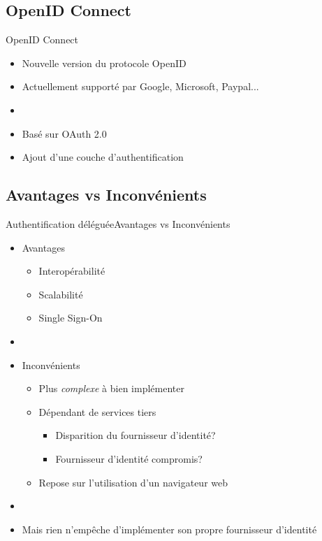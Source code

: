 \documentclass{beamer}
\begin{document}
\subsection{OpenID Connect}

\begin{frame}{OpenID Connect}
  \begin{center}
    \begin{itemize}
    \item Nouvelle version du protocole OpenID
    \item Actuellement supporté par Google, Microsoft, Paypal...
    \item[~]
    \item Basé sur OAuth 2.0
    \item Ajout d'une couche d'authentification
    \end{itemize}
  \end{center}
\end{frame}

\subsection{Avantages vs Inconvénients}

\begin{frame}{Authentification déléguée}{Avantages vs Inconvénients}
  \begin{center}
    \begin{itemize}
      \item Avantages
      \begin{itemize}
        \item Interopérabilité
        \item Scalabilité
        \item Single Sign-On
      \end{itemize}
      \pause
      \item[~]
      \item Inconvénients
      \begin{itemize}
        \item Plus \emph{complexe} à bien implémenter
        \item Dépendant de services tiers
        \begin{itemize}
          \item Disparition du fournisseur d'identité?
          \item Fournisseur d'identité compromis?
        \end{itemize}
        \item Repose sur l'utilisation d'un navigateur web
      \end{itemize}
      \pause
      \item[~]
      \item Mais rien n'empêche d'implémenter son propre fournisseur d'identité
    \end{itemize}
  \end{center}
\end{frame}
\end{document}
